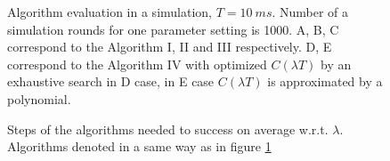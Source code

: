\documentclass[twoside]{article}
\begin{document}
\begin{multicols}{2}
\begin{figure}[H]
{}
\caption{Algorithm evaluation in a simulation, $T=10~ms$. Number of a simulation rounds for one parameter setting is 1000.
 A, B, C correspond to the Algorithm I, II and III respectively.
 D, E correspond to the Algorithm IV with optimized $C(\lambda T)$ by an exhaustive search in D case, 
 in E case $C(\lambda T)$ is approximated by a polynomial.}
\label{fig:alg_eval}
\end{figure}
    
\begin{figure}[H]
{}
\caption{Steps of the algorithms needed to success on average w.r.t. $\lambda$. Algorithms denoted in a same way as in figure \ref{fig:alg_eval}}
\label{fig:alg_steps}
\end{figure}


\end{multicols}
\end{document}

